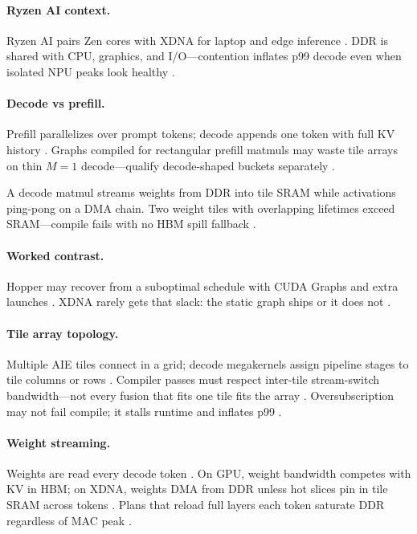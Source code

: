 \paragraph{Ryzen AI context.}
Ryzen AI pairs Zen cores with XDNA for laptop and edge inference \citep{amd2024xdna}.
DDR is shared with CPU, graphics, and I/O---contention inflates p99 decode even when isolated NPU peaks look healthy \citep{patel2025llminference,dlbook}.

\paragraph{Decode vs prefill.}
Prefill parallelizes over prompt tokens; decode appends one token with full KV history \citep{dao2022flashattention,dao2023flashdecoding}.
Graphs compiled for rectangular prefill matmuls may waste tile arrays on thin $M{=}1$ decode---qualify decode-shaped buckets separately \citep{amd2024aie,yirage2026}.

\begin{example}
A decode matmul streams weights from DDR into tile SRAM while activations ping-pong on a DMA chain.
Two weight tiles with overlapping lifetimes exceed SRAM---compile fails with no HBM spill fallback \citep{yirage2026,amd2024xdna}.
\end{example}

\paragraph{Worked contrast.}
Hopper may recover from a suboptimal schedule with CUDA Graphs and extra launches \citep{nvidia2024cudagraphs,taxbreak2026}.
XDNA rarely gets that slack: the static graph ships or it does not \citep{amd2024aie,yirage2026}.

\paragraph{Tile array topology.}
Multiple AIE tiles connect in a grid; decode megakernels assign pipeline stages to tile columns or rows \citep{amd2024xdna,amd2024aie}.
Compiler passes must respect inter-tile stream-switch bandwidth---not every fusion that fits one tile fits the array \citep{yirage2026,chen2020compilerbasedhardw,patel2025llminference}.
Oversubscription may not fail compile; it stalls runtime and inflates p99 \citep{memoryfloor2026}.

\paragraph{Weight streaming.}
Weights are read every decode token \citep{dao2022flashattention,dlbook}.
On GPU, weight bandwidth competes with KV in HBM; on XDNA, weights DMA from DDR unless hot slices pin in tile SRAM across tokens \citep{memoryfloor2026,amd2024xdna}.
Plans that reload full layers each token saturate DDR regardless of MAC peak \citep{patel2025llminference,taxbreak2026}.

